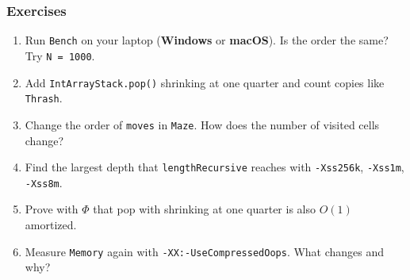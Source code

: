 \documentclass[aspectratio=169,10pt,compress]{beamer}
\newcommand{\win}{\textbf{Windows}}
\newcommand{\mac}{\textbf{macOS}}
\begin{document}
\begin{frame}[t,fragile] \frametitle{Exercises}
  \begin{enumerate}\small
    \item Run \texttt{Bench} on your laptop (\win{} or \mac). Is the order the same? Try \texttt{N = 1000}.
    \item Add \texttt{IntArrayStack.pop()} shrinking at one quarter and count copies like \texttt{Thrash}.
    \item Change the order of \texttt{moves} in \texttt{Maze}. How does the number of visited cells change?
    \item Find the largest depth that \texttt{lengthRecursive} reaches with \texttt{-Xss256k}, \texttt{-Xss1m}, \texttt{-Xss8m}.
    \item Prove with $\Phi$ that pop with shrinking at one quarter is also $O(1)$ amortized.
    \item Measure \texttt{Memory} again with \texttt{-XX:-UseCompressedOops}. What changes and why?
  \end{enumerate}
\end{frame}




\begin{frame}[t,fragile]
	\begin{center}
		\vspace{4cm}
	\end{center}
\end{frame}
\end{document}
